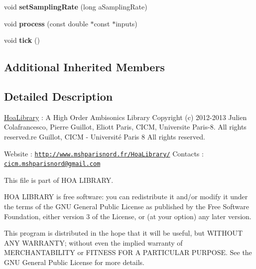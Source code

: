 \begin{DoxyCompactItemize}
\item 
\hypertarget{class_ambisonic_spectrum_a7bd00bbe40241407a84ea6dc8c5df1bd}{void {\bfseries set\-Sampling\-Rate} (long a\-Sampling\-Rate)}\label{class_ambisonic_spectrum_a7bd00bbe40241407a84ea6dc8c5df1bd}

\item 
\hypertarget{class_ambisonic_spectrum_aec69f768c208a83f5ce55268b942ca1a}{void {\bfseries process} (const double $\ast$const $\ast$inputs)}\label{class_ambisonic_spectrum_aec69f768c208a83f5ce55268b942ca1a}

\item 
\hypertarget{class_ambisonic_spectrum_ab3ab5df934defcaa6e86502f61589b21}{void {\bfseries tick} ()}\label{class_ambisonic_spectrum_ab3ab5df934defcaa6e86502f61589b21}

\end{DoxyCompactItemize}
\subsection*{Additional Inherited Members}


\subsection{Detailed Description}
\hyperlink{interface_hoa_library}{Hoa\-Library} \-: A High Order Ambisonics Library Copyright (c) 2012-\/2013 Julien Colafrancesco, Pierre Guillot, Eliott Paris, C\-I\-C\-M, Universite Paris-\/8. All rights reserved.\-re Guillot, C\-I\-C\-M -\/ Université Paris 8 All rights reserved.

Website \-: \href{http://www.mshparisnord.fr/HoaLibrary/}{\tt http\-://www.\-mshparisnord.\-fr/\-Hoa\-Library/} Contacts \-: \href{mailto:cicm.mshparisnord@gmail.com}{\tt cicm.\-mshparisnord@gmail.\-com}

This file is part of H\-O\-A L\-I\-B\-R\-A\-R\-Y.

H\-O\-A L\-I\-B\-R\-A\-R\-Y is free software\-: you can redistribute it and/or modify it under the terms of the G\-N\-U General Public License as published by the Free Software Foundation, either version 3 of the License, or (at your option) any later version.

This program is distributed in the hope that it will be useful, but W\-I\-T\-H\-O\-U\-T A\-N\-Y W\-A\-R\-R\-A\-N\-T\-Y; without even the implied warranty of M\-E\-R\-C\-H\-A\-N\-T\-A\-B\-I\-L\-I\-T\-Y or F\-I\-T\-N\-E\-S\-S F\-O\-R A P\-A\-R\-T\-I\-C\-U\-L\-A\-R P\-U\-R\-P\-O\-S\-E. See the G\-N\-U General Public License for more details.

